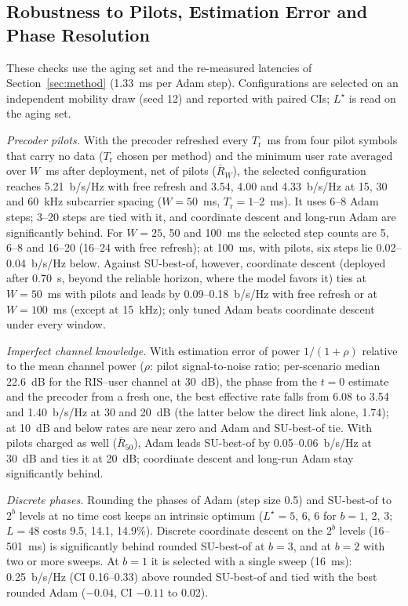 \subsection{Robustness to Pilots, Estimation Error and Phase Resolution}
\label{sec:res_robust}
These checks use the aging set and the re-measured latencies of Section~\ref{sec:method} (1.33~ms per Adam step). Configurations are selected on an independent mobility draw (seed 12) and reported with paired CIs; $L^\star$ is read on the aging set.

\emph{Precoder pilots.} With the precoder refreshed every $T_{\mathrm{r}}$~ms from four pilot symbols that carry no data ($T_{\mathrm{r}}$ chosen per method) and the minimum user rate averaged over $W$~ms after deployment, net of pilots ($\bar{R}_W$), the selected configuration reaches 5.21~b/s/Hz with free refresh and 3.54, 4.00 and 4.33~b/s/Hz at 15, 30 and 60~kHz subcarrier spacing ($W=50$~ms, $T_{\mathrm{r}}=1$--2~ms). It uses 6--8 Adam steps; 3--20 steps are tied with it, and coordinate descent and long-run Adam are significantly behind. For $W=25$, 50 and 100~ms the selected step counts are 5, 6--8 and 16--20 (16--24 with free refresh); at 100~ms, with pilots, six steps lie 0.02--0.04~b/s/Hz below. Against SU-best-of, however, coordinate descent (deployed after 0.70~s, beyond the reliable horizon, where the model favors it) ties at $W=50$~ms with pilots and leads by 0.09--0.18~b/s/Hz with free refresh or at $W=100$~ms (except at 15~kHz); only tuned Adam beats coordinate descent under every window.

\emph{Imperfect channel knowledge.} With estimation error of power $1/(1+\rho)$ relative to the mean channel power ($\rho$: pilot signal-to-noise ratio; per-scenario median 22.6~dB for the RIS--user channel at 30~dB), the phase from the $t=0$ estimate and the precoder from a fresh one, the best effective rate falls from 6.08 to 3.54 and 1.40~b/s/Hz at 30 and 20~dB (the latter below the direct link alone, 1.74); at 10~dB and below rates are near zero and Adam and SU-best-of tie. With pilots charged as well ($\bar{R}_{50}$), Adam leads SU-best-of by 0.05--0.06~b/s/Hz at 30~dB and ties it at 20~dB; coordinate descent and long-run Adam stay significantly behind.

\emph{Discrete phases.} Rounding the phases of Adam (step size 0.5) and SU-best-of to $2^b$ levels at no time cost keeps an intrinsic optimum ($L^\star=5$, 6, 6 for $b=1$, 2, 3; $L=48$ costs 9.5, 14.1, 14.9\%). Discrete coordinate descent on the $2^b$ levels (16--501~ms) is significantly behind rounded SU-best-of at $b=3$, and at $b=2$ with two or more sweeps. At $b=1$ it is selected with a single sweep (16~ms): 0.25~b/s/Hz (CI 0.16--0.33) above rounded SU-best-of and tied with the best rounded Adam ($-0.04$, CI $-0.11$ to 0.02).
